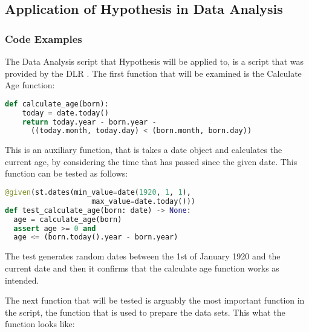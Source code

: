 \documentclass[runningheads]{llncs}
\begin{document}

\subsection{Application of Hypothesis in Data Analysis}
\subsubsection{Code Examples}
The Data Analysis script that Hypothesis will be applied to, is a script that was provided by the DLR \cite{Stoffers2021Astronaut}.
The first function that will be examined is the Calculate Age function:

\begin{lstlisting}[language=Python]
  def calculate_age(born):
    today = date.today()
    return today.year - born.year - 
      ((today.month, today.day) < (born.month, born.day))
\end{lstlisting}

This is an auxiliary function, that is takes a date object and calculates the current age, by considering the time
that has passed since the given date. This function can be tested as follows:

\begin{lstlisting}[language=Python]
@given(st.dates(min_value=date(1920, 1, 1), 
                    max_value=date.today()))
def test_calculate_age(born: date) -> None:
  age = calculate_age(born)
  assert age >= 0 and 
  age <= (born.today().year - born.year)
\end{lstlisting}

The test generates random dates between the 1st of January 1920 and the current date and then
it confirms that the calculate age function works as intended.

The next function that will be tested is arguably the most important function in the script, the function that is used to prepare the data sets.
This what the function looks like:
\end{document}
